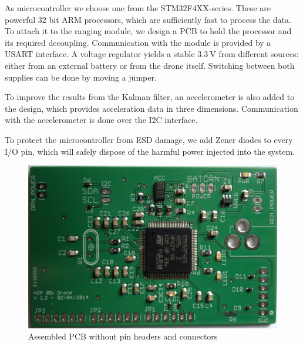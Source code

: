 \documentclass[a4paper]{article}        %
\begin{document}
  As microcontroller we choose one from the STM32F4XX-series. These are powerful 32 bit ARM processors, which are sufficiently fast to process the data.
  To attach it to the ranging module, we design a PCB to hold the processor and its required decoupling. Communication with the module is provided by a USART interface.
  A voltage regulator yields a stable $\SI{3.3}{\volt}$ from different sources: either from an external battery or from the drone itself. Switching between both supplies can be done by moving a jumper.

  To improve the results from the Kalman filter, an accelerometer is also added to the design, which provides acceleration data in three dimensions. Communication with the accelerometer is done over the I2C interface.

  To protect the microcontroller from ESD damage, we add Zener diodes to every I/O pin, which will safely dispose of the harmful power injected into the system.

  \begin{figure}
    \begin{center}
      \includegraphics[width=\textwidth]{images/final_pcb_result.eps}
      \caption{Assembled PCB without pin headers and connectors}
      \label{fig:final_pcb}
    \end{center}
  \end{figure}
  
\end{document}
